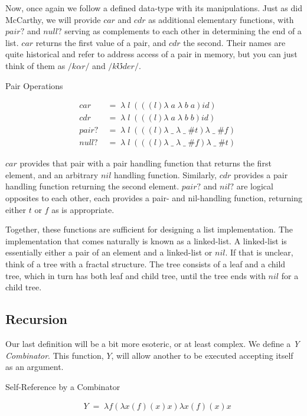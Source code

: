 Now, once again we follow a defined data-type with its manipulations. Just as did 
McCarthy, we will provide $car$ and $cdr$ as additional elementary functions, with 
$pair?$ and $null?$ serving as complements to each other in determining the end of 
a list. $car$ returns the first value of a pair, and $cdr$ the second. Their names 
are quite historical and refer to address access of a pair in memory, but you can 
just think of them as $/k \alpha r/$ and $/k \mho d e r/$.

Pair Operations
\begin{figure}[ht]
\caption{}\label{scheme}
\begin{align*}
& car \; &= \; \lambda \; l \; (((l)\lambda \; a \; \lambda \; b \; a)id)
\\& cdr \; &= \; \lambda \; l \; (((l)\lambda \; a \; \lambda \; b \; b)id)
\\& pair? \; &= \; \lambda \; l \; (((l)\lambda \; \_ \; \lambda \; \_ \; \#t)\lambda \; \_ \; \#f)
\\& null? \; &= \; \lambda \; l \; (((l)\lambda \; \_ \; \lambda \; \_ \; \#f)\lambda \; \_ \; \#t)
\end{align*}
\end{figure}

$car$ provides that pair with a pair handling function that returns the first 
element, and an arbitrary $nil$ handling function. Similarly, $cdr$ provides a 
pair handling function returning the second element. $pair?$ and $nil?$ are 
logical opposites to each other, each provides a pair- and nil-handling function, 
returning either $t$ or $f$ as is appropriate.

Together, these functions are sufficient for designing a list implementation. The 
implementation that comes naturally is known as a linked-list. A linked-list is 
essentially either a pair of an element and a linked-list or $nil$. If that is 
unclear, think of a tree with a fractal structure. The tree consists of a leaf and 
a child tree, which in turn has both leaf and child tree, until the tree ends with 
$nil$ for a child tree.

\subsection{Recursion}
Our last definition will be a bit more esoteric, or at least complex. We define a 
\emph{Y Combinator}. This function, $Y$, will allow another to be executed accepting 
itself as an argument.

Self-Reference by a Combinator
\begin{figure}[ht]
\caption{}\label{scheme}
\begin{align*}
& Y \; = \; λf(λx(f)(x)x)λx(f)(x)x
\end{align*}
\end{figure}

